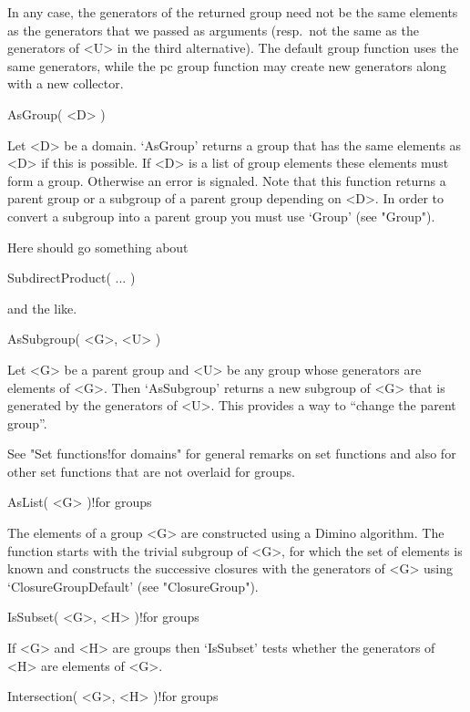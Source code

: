 In  any case, the  generators of the returned group  need not be the same
elements as the  generators that we   passed as arguments (resp.~not  the
same as  the generators of  <U>  in the third  alternative). The  default
group function uses the same generators, while the  pc group function may
create new generators along with a new collector.

\>AsGroup( <D> )

Let <D> be a domain. `AsGroup' returns a group that has the same elements
as <D>  if this is  possible.  If <D> is a  list of  group elements these
elements must form a group.   Otherwise an error  is signaled.  Note that
this function  returns a  parent group or  a  subgroup of a parent  group
depending on <D>. In order to convert a subgroup into  a parent group you
must use `Group' (see "Group").

Here should go something about

\>SubdirectProduct( ... )

and the like.

\null

\>AsSubgroup( <G>, <U> )

Let  <G> be  a  parent group  and <U>  be any group  whose generators are
elements of <G>. Then `AsSubgroup' returns a  new subgroup of <G> that is
generated by the generators  of <U>. This provides  a way to ``change the
parent group''.


See "Set functions!for domains" for general remarks  on set functions and
also for other set functions that are not overlaid for groups.

\>AsList( <G> )!{for groups}

The  elements of a  group  <G> are constructed  using a Dimino algorithm.
The function starts  with the trivial subgroup of <G>,  for which the set
of elements  is  known and constructs the  successive  closures with  the
generators of <G> using `ClosureGroupDefault' (see "ClosureGroup").

\>IsSubset( <G>, <H> )!{for groups}

If <G> and <H> are groups then `IsSubset' tests whether the generators of
<H> are elements of <G>.

\>Intersection( <G>, <H> )!{for groups}

